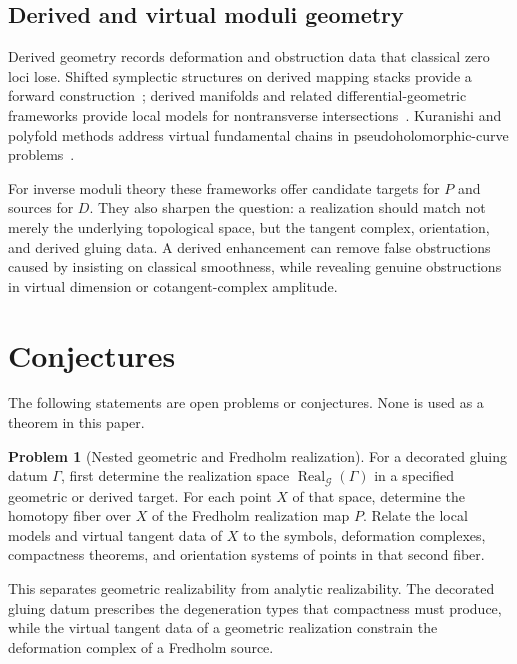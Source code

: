 \documentclass[11pt,letterpaper,twoside]{article}
\theoremstyle{plain}
\theoremstyle{definition}
\newtheorem{problem}[theorem]{Problem}
\theoremstyle{remark}
\let\cite\citep
\newcommand{\Real}{\operatorname{Real}}
\begin{document}
\subsection{Derived and virtual moduli geometry}

Derived geometry records deformation and obstruction data that classical zero loci lose.  Shifted symplectic structures on derived mapping stacks provide a forward construction~\cite{pantev2013}; derived manifolds and related differential-geometric frameworks provide local models for nontransverse intersections~\cite{joyce2012}.  Kuranishi and polyfold methods address virtual fundamental chains in pseudoholomorphic-curve problems~\cite{fooo2009,polyfold2017}.

For inverse moduli theory these frameworks offer candidate targets for \(P\) and sources for \(D\).  They also sharpen the question: a realization should match not merely the underlying topological space, but the tangent complex, orientation, and derived gluing data.  A derived enhancement can remove false obstructions caused by insisting on classical smoothness, while revealing genuine obstructions in virtual dimension or cotangent-complex amplitude.

\section{Conjectures}\label{sec:conjectures}

The following statements are open problems or conjectures.  None is used as a theorem in this paper.

\begin{problem}[Nested geometric and Fredholm realization]\label{prob:nested-realization}
For a decorated gluing datum \(\Gamma\), first determine the realization space \(\Real_{\mathcal G}(\Gamma)\) in a specified geometric or derived target.  For each point \(X\) of that space, determine the homotopy fiber over \(X\) of the Fredholm realization map \(P\).  Relate the local models and virtual tangent data of \(X\) to the symbols, deformation complexes, compactness theorems, and orientation systems of points in that second fiber.
\end{problem}

This separates geometric realizability from analytic realizability.  The decorated gluing datum prescribes the degeneration types that compactness must produce, while the virtual tangent data of a geometric realization constrain the deformation complex of a Fredholm source.
\end{document}
